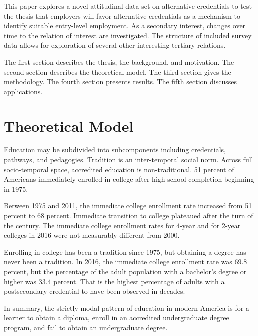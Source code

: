 \documentclass[AER]{./aea-latex-templates/AEA}
\begin{document}
        This paper explores a novel attitudinal data set on alternative
        credentials to test the thesis that employers will favor
        alternative credentials as a mechanism to identify suitable entry-level
        employment. As a secondary interest, changes over time to the relation of
        interest are investigated. The structure of included survey data allows
        for exploration of several other interesting tertiary relations.
        
        The first section describes the thesis, the background, and motivation. The
        second section describes the theoretical model. The third section gives the
        methodology. The fourth section presents results. The fifth section
        discusses applications.
        
        \section{Theoretical Model}
        
        Education may be subdivided into subcomponents including credentials, pathways,
        and pedagogies. Tradition is an inter-temporal social norm. Across
        full socio-temporal space, accredited education is non-traditional. 51
        percent of Americans immediately enrolled in college after high school completion
        beginning in 1975\cite{aud2013condition}.
        
        Between 1975 and 2011, the immediate college enrollment
        rate increased from 51 percent to 68 percent. Immediate transition to
        college plateaued after the turn of the century. The immediate college
        enrollment rates for 4-year and for 2-year colleges in 2016 were not
        measurably different from 2000\cite{nces2019condition}.
        
        Enrolling in college has been a tradition since 1975, but obtaining a
        degree has never been a tradition. In 2016, the immediate college
        enrollment rate was 69.8 percent\cite{nces_2019}, but the
        percentage of the adult population with a bachelor’s degree or higher was
        33.4 percent\cite{censusbureau_2017}. That is the highest percentage of
        adults with a postsecondary credential to have been observed in decades.
        
        In summary, the strictly modal pattern of education in modern America
        is for a learner to obtain a diploma, enroll in an accredited undergraduate degree
        program, and fail to obtain an undergraduate degree.
        
\end{document}
